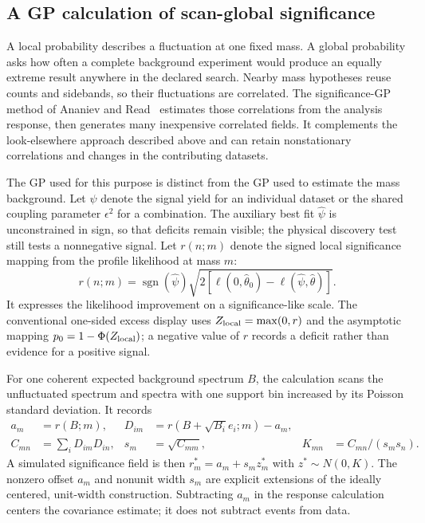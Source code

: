 \subsection{A GP calculation of scan-global significance}
\label{v5-sec:global-method}\label{sec:v5-global}
A local probability describes a fluctuation at one fixed mass. A global
probability asks how often a complete background experiment would produce
an equally extreme result anywhere in the declared search. Nearby mass
hypotheses reuse counts and sidebands, so their fluctuations are correlated.
The significance-GP method of Ananiev and Read~\cite{AnanievRead2023}
estimates those correlations from the analysis response, then generates
many inexpensive correlated fields. It complements the look-elsewhere
approach described above and can retain nonstationary correlations and
changes in the contributing datasets.

The GP used for this purpose is distinct from the GP used to estimate the
mass background. Let $\psi$ denote the signal yield for an individual
dataset or the shared coupling parameter $\epsilon^2$ for a combination.
The auxiliary best fit $\widehat\psi$ is unconstrained in sign, so that
deficits remain visible; the physical discovery test still tests a
nonnegative signal. Let $r(n;m)$ denote the signed local significance mapping
from the profile likelihood at mass $m$:
\begin{equation}
 r(n;m)=\operatorname{sgn}(\widehat\psi)
 \sqrt{2[\ell(0,\widehat\theta_0)-\ell(\widehat\psi,\widehat\theta)]}.
 \label{v5-eq:signed-local-mapping}
\end{equation}
It expresses the likelihood improvement on a significance-like scale.
The conventional one-sided excess display uses $Z_{\rm local}=\max(0,r)$
and the asymptotic mapping $p_0=1-\Phi(Z_{\rm local})$; a negative value of
$r$ records a deficit rather than evidence for a positive signal.

For one coherent expected background spectrum $B$, the calculation scans
the unfluctuated spectrum and spectra with one support bin increased by
its Poisson standard deviation. It records
\begin{align}
 a_m&=r(B;m), & D_{im}&=r(B+\sqrt{B_i}e_i;m)-a_m,\\
 C_{mn}&=\sum_iD_{im}D_{in}, & s_m&=\sqrt{C_{mm}},
 & K_{mn}&=C_{mn}/(s_ms_n).
 \label{v5-eq:field-response}
\end{align}
A simulated significance field is then
$r_m^*=a_m+s_mz_m^*$ with $z^*\sim N(0,K)$. The nonzero offset $a_m$ and
nonunit width $s_m$ are explicit extensions of the ideally centered,
unit-width construction. Subtracting $a_m$ in the response calculation
centers the covariance estimate; it does not subtract events from data.

